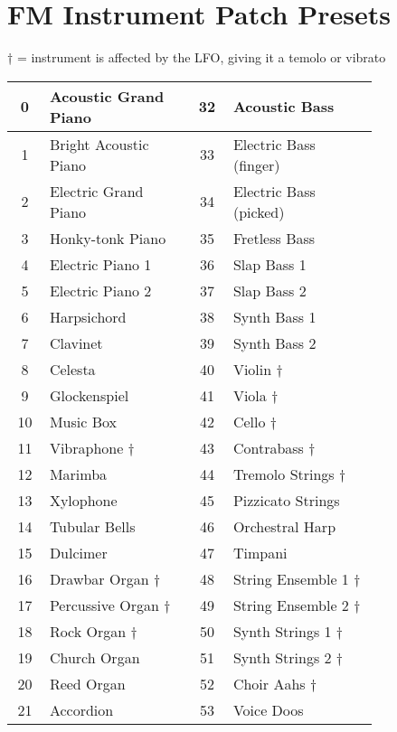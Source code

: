 \chapter*{FM Instrument Patch Presets}

† = instrument is affected by the LFO, giving it a temolo or vibrato

\begin{tabular}{|c|p{0.4\linewidth}|c|p{0.4\linewidth}|}
	\hline
	0  &  Acoustic Grand Piano  & 32  &  Acoustic Bass  \\ \hline
	1  &  Bright Acoustic Piano  & 33  &  Electric Bass (finger)  \\ \hline
	2  &  Electric Grand Piano  & 34  &  Electric Bass (picked)  \\ \hline
	3  &  Honky-tonk Piano  & 35  &  Fretless Bass  \\ \hline
	4  &  Electric Piano 1  & 36  &  Slap Bass 1  \\ \hline
	5  &  Electric Piano 2  & 37  &  Slap Bass 2  \\ \hline
	6  &  Harpsichord  & 38  &  Synth Bass 1  \\ \hline
	7  &  Clavinet  & 39  &  Synth Bass 2  \\ \hline
	8  &  Celesta  & 40  &  Violin † \\ \hline
	9  &  Glockenspiel  & 41  &  Viola † \\ \hline
	10  &  Music Box  & 42  &  Cello † \\ \hline
	11  &  Vibraphone †  & 43  &  Contrabass † \\ \hline
	12  &  Marimba  & 44  &  Tremolo Strings † \\ \hline
	13  &  Xylophone  & 45  &  Pizzicato Strings  \\ \hline
	14  &  Tubular Bells  & 46  &  Orchestral Harp  \\ \hline
	15  &  Dulcimer  & 47  &  Timpani  \\ \hline
	16  &  Drawbar Organ † & 48  &  String Ensemble 1 † \\ \hline
	17  &  Percussive Organ † & 49  &  String Ensemble 2 † \\ \hline
	18  &  Rock Organ † & 50  &  Synth Strings 1 † \\ \hline
	19  &  Church Organ  & 51  &  Synth Strings 2 † \\ \hline
	20  &  Reed Organ  & 52  &  Choir Aahs † \\ \hline
	21  &  Accordion  & 53  &  Voice Doos  \\ \hline

\end{tabular}
